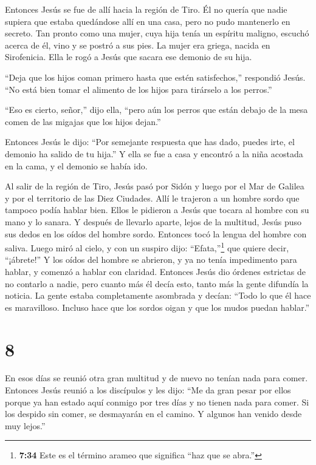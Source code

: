  Entonces Jesús se fue de allí hacia la región de Tiro. Él
no quería que nadie supiera que estaba quedándose allí en una casa, pero
no pudo mantenerlo en secreto.  Tan pronto como una mujer,
cuya hija tenía un espíritu maligno, escuchó acerca de él, vino y se
postró a sus pies.  La mujer era griega, nacida en
Sirofenicia. Ella le rogó a Jesús que sacara ese demonio de su hija.

 ``Deja que los hijos coman primero hasta que estén
satisfechos,'' respondió Jesús. ``No está bien tomar el alimento de los
hijos para tirárselo a los perros.''

 ``Eso es cierto, señor,'' dijo ella, ``pero aún los perros
que están debajo de la mesa comen de las migajas que los hijos dejan.''

 Entonces Jesús le dijo: ``Por semejante respuesta que has
dado, puedes irte, el demonio ha salido de tu hija.''  Y
ella se fue a casa y encontró a la niña acostada en la cama, y el
demonio se había ido.

 Al salir de la región de Tiro, Jesús pasó por Sidón y
luego por el Mar de Galilea y por el territorio de las Diez Ciudades.
 Allí le trajeron a un hombre sordo que tampoco podía
hablar bien. Ellos le pidieron a Jesús que tocara al hombre con su mano
y lo sanara.  Y después de llevarlo aparte, lejos de la
multitud, Jesús puso sus dedos en los oídos del hombre sordo. Entonces
tocó la lengua del hombre con saliva.  Luego miró al cielo,
y con un suspiro dijo: ``Efata,''\footnote{\textbf{7:34} Este es el
  término arameo que significa ``haz que se abra.''} que quiere decir,
``¡ábrete!''  Y los oídos del hombre se abrieron, y ya no
tenía impedimento para hablar, y comenzó a hablar con claridad.
 Entonces Jesús dio órdenes estrictas de no contarlo a
nadie, pero cuanto más él decía esto, tanto más la gente difundía la
noticia.  La gente estaba completamente asombrada y decían:
``Todo lo que él hace es maravilloso. Incluso hace que los sordos oigan
y que los mudos puedan hablar.''

\hypertarget{section-7}{%
\section{8}\label{section-7}}

 En esos días se reunió otra gran multitud y de nuevo no
tenían nada para comer. Entonces Jesús reunió a los discípulos y les
dijo:  ``Me da gran pesar por ellos porque ya han estado
aquí conmigo por tres días y no tienen nada para comer.  Si
los despido sin comer, se desmayarán en el camino. Y algunos han venido
desde muy lejos.''

